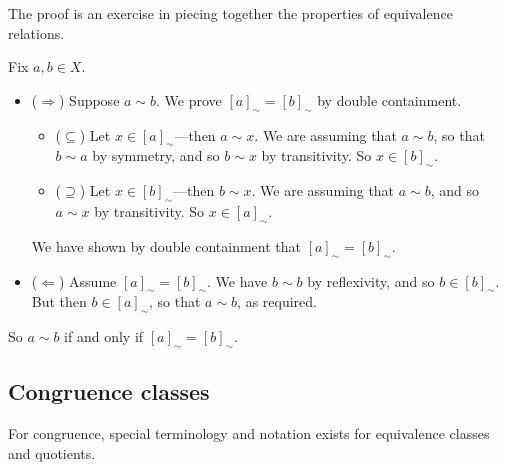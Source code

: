 \begin{cproof}
The proof is an exercise in piecing together the properties of equivalence relations.

Fix $a, b \in X$.
\begin{itemize}
\item ($\Rightarrow$) Suppose $a \sim b$. We prove $[a]_{\sim} = [b]_{\sim}$ by double containment.
\begin{itemize}
\item ($\subseteq$) Let $x \in [a]_{\sim}$---then $a \sim x$. We are assuming that $a \sim b$, so that $b \sim a$ by symmetry, and so $b \sim x$ by transitivity. So $x \in [b]_{\sim}$.
\item ($\supseteq$) Let $x \in [b]_{\sim}$---then $b \sim x$. We are assuming that $a \sim b$, and so $a \sim x$ by transitivity. So $x \in [a]_{\sim}$.
\end{itemize}
We have shown by double containment that $[a]_{\sim} = [b]_{\sim}$.

\item ($\Leftarrow$) Assume $[a]_{\sim} = [b]_{\sim}$. We have $b \sim b$ by reflexivity, and so $b \in [b]_{\sim}$. But then $b \in [a]_{\sim}$, so that $a \sim b$, as required.
\end{itemize}

So $a \sim b$ if and only if $[a]_{\sim} = [b]_{\sim}$.
\end{cproof}

%

\subsection*{Congruence classes}

For congruence, special terminology and notation exists for equivalence classes and quotients.

